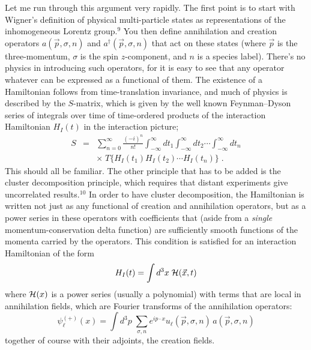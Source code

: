 \documentclass[12pt]{article}
\begin{document}
Let me run through this argument very rapidly.  The first
point is to start with Wigner's definition of physical
multi-particle states as representations of the
inhomogeneous Lorentz group.$^9$  You then define
annihilation
and creation operators $a(\vec{p},\sigma,n)$ and
$a^\dagger(\vec{p},\sigma,n)$ that act on these states
(where $\vec{p}$ is the three-momentum, $\sigma$ is the spin
$z$-component, and $n$ is a species label).   There's no
physics in introducing such operators, for it is easy to see
that any operator whatever can be expressed as a functional
of them.  The existence of a Hamiltonian follows from
time-translation invariance, and much of physics is
described by
the $S$-matrix, which is given by the well known
Feynman--Dyson series of integrals over time of time-ordered
products of the interaction Hamiltonian $H_I(t)$  in the
interaction picture;
\begin{eqnarray} S&=&\sum_{n=0}^\infty\frac{(-
i)^n}{n!}\int_{-\infty}^\infty dt_1
\int_{-\infty}^\infty dt_2\cdots \int_{-\infty}^\infty dt_n
\nonumber\\&&\times\;
T\{H_I(t_1)H_I(t_2)\cdots H_I(t_n)\}\;.
\end{eqnarray}
This should all be familiar.    The other principle that has
to be added is the cluster decomposition principle, which
requires that distant experiments give uncorrelated
results.$^{10}$
In order to have cluster decomposition, the Hamiltonian is
written not just as any functional of creation and
annihilation operators, but as a power series in these
operators with coefficients that (aside from a {\em single}
momentum-conservation delta function) are sufficiently
smooth functions of the momenta carried by the operators.
This condition is satisfied for an interaction Hamiltonian
of the  form
\begin{equation}
H_I(t)=\int d^3x\; {\cal H}(\vec{x},t)
\end{equation}
where ${\cal H}(x)$ is a power series (usually a polynomial)
with terms that are local in annihilation fields, which are
Fourier transforms of the annihilation operators:
\begin{equation} \psi^{(+)}_\ell(x)= \int
d^3p\;\sum_{\sigma,n} e^{ip\cdot x }u_\ell({\vec
p},\sigma,n)\,a({\vec p},\sigma,n)
\end{equation}
together of course with their adjoints, the creation fields.
\end{document}
